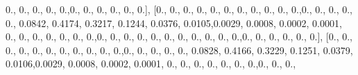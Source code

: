 \documentclass[
]{book}
\newenvironment{Shaded}{\begin{snugshade}}{\end{snugshade}}
\newcommand{\FloatTok}[1]{\textcolor[rgb]{0.00,0.00,0.81}{#1}}
\newcommand{\NormalTok}[1]{#1}
\begin{document}
\begin{Shaded}
\begin{Highlighting}[]
\FloatTok{0.}\NormalTok{, }\FloatTok{0.}\NormalTok{, }\FloatTok{0.}\NormalTok{, }\FloatTok{0.}\NormalTok{, }\FloatTok{0.}\NormalTok{,}\FloatTok{0.}\NormalTok{, }\FloatTok{0.}\NormalTok{, }\FloatTok{0.}\NormalTok{, }\FloatTok{0.}\NormalTok{, }\FloatTok{0.}\NormalTok{, }\FloatTok{0.}\NormalTok{], [}\FloatTok{0.}\NormalTok{, }\FloatTok{0.}\NormalTok{, }\FloatTok{0.}\NormalTok{, }\FloatTok{0.}\NormalTok{, }\FloatTok{0.}\NormalTok{, }\FloatTok{0.}\NormalTok{, }\FloatTok{0.}\NormalTok{, }\FloatTok{0.}\NormalTok{, }\FloatTok{0.}\NormalTok{,}
\FloatTok{0.}\NormalTok{, }\FloatTok{0.}\NormalTok{,}\FloatTok{0.}\NormalTok{, }\FloatTok{0.}\NormalTok{, }\FloatTok{0.}\NormalTok{, }\FloatTok{0.}\NormalTok{, }\FloatTok{0.}\NormalTok{, }\FloatTok{0.0842}\NormalTok{, }\FloatTok{0.4174}\NormalTok{, }\FloatTok{0.3217}\NormalTok{, }\FloatTok{0.1244}\NormalTok{, }\FloatTok{0.0376}\NormalTok{,}
\FloatTok{0.0105}\NormalTok{,}\FloatTok{0.0029}\NormalTok{, }\FloatTok{0.0008}\NormalTok{, }\FloatTok{0.0002}\NormalTok{, }\FloatTok{0.0001}\NormalTok{, }\FloatTok{0.}\NormalTok{, }\FloatTok{0.}\NormalTok{, }\FloatTok{0.}\NormalTok{, }\FloatTok{0.}\NormalTok{, }\FloatTok{0.}\NormalTok{, }\FloatTok{0.}\NormalTok{, }\FloatTok{0.}\NormalTok{,}\FloatTok{0.}\NormalTok{, }\FloatTok{0.}\NormalTok{, }\FloatTok{0.}\NormalTok{,}
\FloatTok{0.}\NormalTok{, }\FloatTok{0.}\NormalTok{, }\FloatTok{0.}\NormalTok{, }\FloatTok{0.}\NormalTok{, }\FloatTok{0.}\NormalTok{, }\FloatTok{0.}\NormalTok{, }\FloatTok{0.}\NormalTok{, }\FloatTok{0.}\NormalTok{,}\FloatTok{0.}\NormalTok{, }\FloatTok{0.}\NormalTok{, }\FloatTok{0.}\NormalTok{, }\FloatTok{0.}\NormalTok{, }\FloatTok{0.}\NormalTok{, }\FloatTok{0.}\NormalTok{], [}\FloatTok{0.}\NormalTok{, }\FloatTok{0.}\NormalTok{, }\FloatTok{0.}\NormalTok{, }\FloatTok{0.}\NormalTok{, }\FloatTok{0.}\NormalTok{, }\FloatTok{0.}\NormalTok{,}
\FloatTok{0.}\NormalTok{, }\FloatTok{0.}\NormalTok{, }\FloatTok{0.}\NormalTok{, }\FloatTok{0.}\NormalTok{, }\FloatTok{0.}\NormalTok{,}\FloatTok{0.}\NormalTok{, }\FloatTok{0.}\NormalTok{, }\FloatTok{0.}\NormalTok{, }\FloatTok{0.}\NormalTok{, }\FloatTok{0.}\NormalTok{, }\FloatTok{0.0828}\NormalTok{, }\FloatTok{0.4166}\NormalTok{, }\FloatTok{0.3229}\NormalTok{, }\FloatTok{0.1251}\NormalTok{, }\FloatTok{0.0379}\NormalTok{,}
\FloatTok{0.0106}\NormalTok{,}\FloatTok{0.0029}\NormalTok{, }\FloatTok{0.0008}\NormalTok{, }\FloatTok{0.0002}\NormalTok{, }\FloatTok{0.0001}\NormalTok{, }\FloatTok{0.}\NormalTok{, }\FloatTok{0.}\NormalTok{, }\FloatTok{0.}\NormalTok{, }\FloatTok{0.}\NormalTok{, }\FloatTok{0.}\NormalTok{, }\FloatTok{0.}\NormalTok{, }\FloatTok{0.}\NormalTok{,}\FloatTok{0.}\NormalTok{, }\FloatTok{0.}\NormalTok{, }\FloatTok{0.}\NormalTok{,}

\end{Highlighting}
\end{Shaded}
\end{document}

